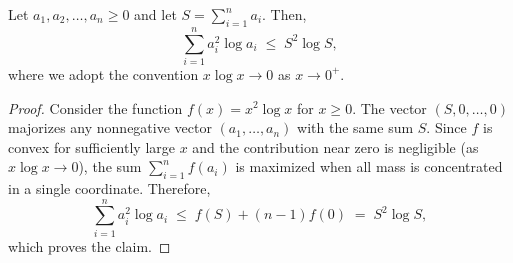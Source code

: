 \begin{lemma}
Let $a_1, a_2, \dots, a_n \ge 0$ and let $S = \sum_{i=1}^n a_i$. Then,
\[
\sum_{i=1}^n a_i^2 \log a_i \;\le\; S^2 \log S,
\]
where we adopt the convention $x \log x \to 0$ as $x \to 0^+$.
\end{lemma}

\begin{proof}
Consider the function $f(x) = x^2 \log x$ for $x \ge 0$. The vector $(S,0,\dots,0)$ majorizes any nonnegative vector $(a_1,\dots,a_n)$ with the same sum $S$. Since $f$ is convex for sufficiently large $x$ and the contribution near zero is negligible (as $x \log x \to 0$), the sum $\sum_{i=1}^n f(a_i)$ is maximized when all mass is concentrated in a single coordinate. Therefore,
\[
\sum_{i=1}^n a_i^2 \log a_i \;\le\; f(S) + (n-1)f(0) \;=\; S^2 \log S,
\]
which proves the claim.
\end{proof}
